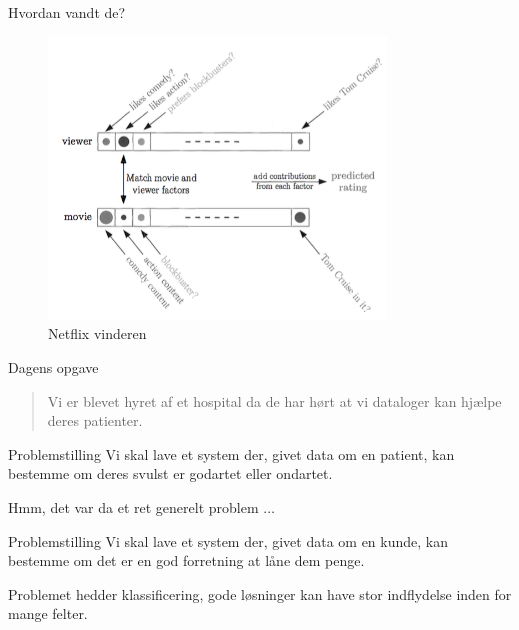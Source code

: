\documentclass[12pt,t]{beamer}
\begin{document}
    \begin{frame}{Hvordan vandt de?}
        \begin{figure}[h!]
            \caption{Netflix vinderen}
            \centering
            \includegraphics[width=0.8\textwidth]{include/netflix.png}
        \end{figure}
    \end{frame}

    \begin{frame}[t]{Dagens opgave}
        \begin{quote}
            Vi er blevet hyret af et hospital da de har hørt at vi dataloger
            kan hjælpe deres patienter.
        \end{quote}
        \pause
        \begin{block}{Problemstilling}
            Vi skal lave et system der, givet data om en patient, kan bestemme
            om deres svulst er godartet eller ondartet.
        \end{block}
        \pause
        \centering Hmm, det var da et ret generelt problem $\dots$
        \pause
        \begin{block}{Problemstilling}
            Vi skal lave et system der, givet data om en \alert{kunde},
            kan bestemme om det er en god forretning at låne dem penge.
        \end{block}
        \pause
        \centering Problemet hedder klassificering, gode løsninger kan have stor
        indflydelse inden for mange felter.
    \end{frame}
\end{document}
